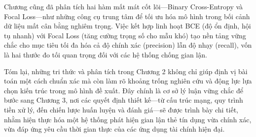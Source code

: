 Chương cũng đã phân tích hai hàm mất mát cốt lõi—Binary Cross-Entropy và Focal Loss—như những công cụ trung tâm để tối ưu hóa mô hình trong bối cảnh dữ liệu mất cân bằng nghiêm trọng. Việc kết hợp linh hoạt BCE (độ ổn định, hội tụ nhanh) với Focal Loss (tăng cường trọng số cho mẫu khó) tạo nền tảng vững chắc cho mục tiêu tối đa hóa cả độ chính xác (precision) lẫn độ nhạy (recall), vốn là hai thước đo tối quan trọng đối với các hệ thống chống gian lận.

Tóm lại, những tri thức và phân tích trong Chương 2 không chỉ giúp định vị bài toán một cách chuẩn xác mà còn làm rõ khoảng trống nghiên cứu và động lực lựa chọn kiến trúc trong mô hình đề xuất. Đây chính là cơ sở lý luận vững chắc để bước sang Chương 3, nơi các quyết định thiết kế—từ cấu trúc mạng, quy trình tiền xử lý, đến chiến lược huấn luyện và đánh giá—sẽ được trình bày chi tiết, nhằm hiện thực hóa một hệ thống phát hiện gian lận thẻ tín dụng vừa chính xác, vừa đáp ứng yêu cầu thời gian thực của các ứng dụng tài chính hiện đại.


